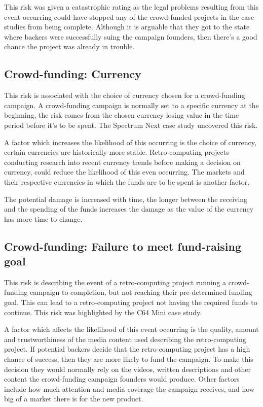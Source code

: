 This risk was given a catastrophic rating as the legal problems resulting from this event occurring could have stopped any of the crowd-funded projects in the case studies from being complete. Although it is arguable that they got to the state where backers were successfully suing the campaign founders, then there's a good chance the project was already in trouble.\\

\subsection{Crowd-funding: Currency}
This risk is associated with the choice of currency chosen for a crowd-funding campaign. A crowd-funding campaign is normally set to a specific currency at the beginning, the risk comes from the chosen currency losing value in the time period before it's to be spent. The Spectrum Next case study uncovered this risk. 

A factor which increases the likelihood of this occurring is the choice of currency, certain currencies are historically more stable. Retro-computing projects conducting research into recent currency trends before making a decision on currency, could reduce the likelihood of this even occurring. The markets and their respective currencies in which the funds are to be spent is another factor.

The potential damage is increased with time, the longer between the receiving and the spending of the funds increases the damage as the value of the currency has more time to change. 

\subsection{Crowd-funding: Failure to meet fund-raising goal}
This risk is describing the event of a retro-computing project running a crowd-funding campaign to completion, but not reaching their pre-determined funding goal. This can lead to a retro-computing project not having the required funds to continue. This risk was highlighted by the C64 Mini case study.

A factor which affects the likelihood of this event occurring is the quality, amount and trustworthiness of the media content used describing the retro-computing project. If potential backers decide that the retro-computing project has a high chance of success, then they are more likely to fund the campaign. To make this decision they would normally rely on the videos, written descriptions and other content the crowd-funding campaign founders would produce. Other factors include how much attention and media coverage the campaign receives, and how big of a market there is for the new product. 


